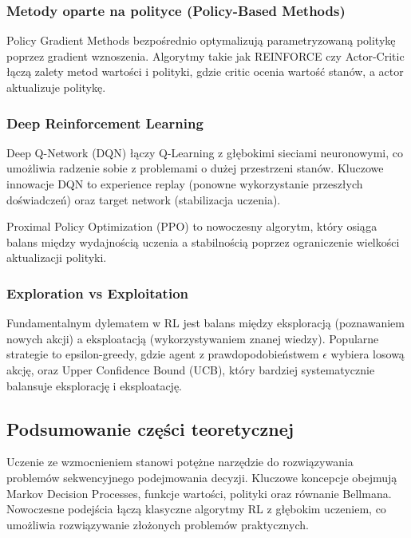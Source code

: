 \documentclass[12pt,a4paper]{article}
\begin{document}
\subsubsection{Metody oparte na polityce (Policy-Based Methods)}

Policy Gradient Methods bezpośrednio optymalizują parametryzowaną politykę poprzez gradient wznoszenia. Algorytmy takie jak REINFORCE czy Actor-Critic łączą zalety metod wartości i polityki, gdzie critic ocenia wartość stanów, a actor aktualizuje politykę.

\subsubsection{Deep Reinforcement Learning}

Deep Q-Network (DQN) łączy Q-Learning z głębokimi sieciami neuronowymi, co umożliwia radzenie sobie z problemami o dużej przestrzeni stanów. Kluczowe innowacje DQN to experience replay (ponowne wykorzystanie przeszłych doświadczeń) oraz target network (stabilizacja uczenia).

Proximal Policy Optimization (PPO) to nowoczesny algorytm, który osiąga balans między wydajnością uczenia a stabilnością poprzez ograniczenie wielkości aktualizacji polityki.

\subsubsection{Exploration vs Exploitation}

Fundamentalnym dylematem w RL jest balans między eksploracją (poznawaniem nowych akcji) a eksploatacją (wykorzystywaniem znanej wiedzy). Popularne strategie to epsilon-greedy, gdzie agent z prawdopodobieństwem $\epsilon$ wybiera losową akcję, oraz Upper Confidence Bound (UCB), który bardziej systematycznie balansuje eksplorację i eksploatację.

\subsection{Podsumowanie części teoretycznej}

Uczenie ze wzmocnieniem stanowi potężne narzędzie do rozwiązywania problemów sekwencyjnego podejmowania decyzji. Kluczowe koncepcje obejmują Markov Decision Processes, funkcje wartości, polityki oraz równanie Bellmana. Nowoczesne podejścia łączą klasyczne algorytmy RL z głębokim uczeniem, co umożliwia rozwiązywanie złożonych problemów praktycznych.
\end{document}
